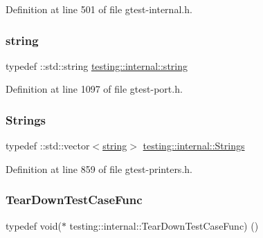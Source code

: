 Definition at line 501 of file gtest-\/internal.\+h.

\mbox{\label{namespacetesting_1_1internal_a8e8ff5b11e64078831112677156cb111}} 
\subsubsection{\texorpdfstring{string}{string}}
{\footnotesize\ttfamily typedef \+::std\+::string \hyperlink{namespacetesting_1_1internal_a8e8ff5b11e64078831112677156cb111}{testing\+::internal\+::string}}



Definition at line 1097 of file gtest-\/port.\+h.

\mbox{\label{namespacetesting_1_1internal_a7706b17f05f4b49e351b052ae4e05073}} 
\subsubsection{\texorpdfstring{Strings}{Strings}}
{\footnotesize\ttfamily typedef \+::std\+::vector$<$\hyperlink{namespacetesting_1_1internal_a8e8ff5b11e64078831112677156cb111}{string}$>$ \hyperlink{namespacetesting_1_1internal_a7706b17f05f4b49e351b052ae4e05073}{testing\+::internal\+::\+Strings}}



Definition at line 859 of file gtest-\/printers.\+h.

\mbox{\label{namespacetesting_1_1internal_a085e31321d0d029c04d2a79234f60c1a}} 
\subsubsection{\texorpdfstring{Tear\+Down\+Test\+Case\+Func}{TearDownTestCaseFunc}}
{\footnotesize\ttfamily typedef void($\ast$ testing\+::internal\+::\+Tear\+Down\+Test\+Case\+Func) ()}



